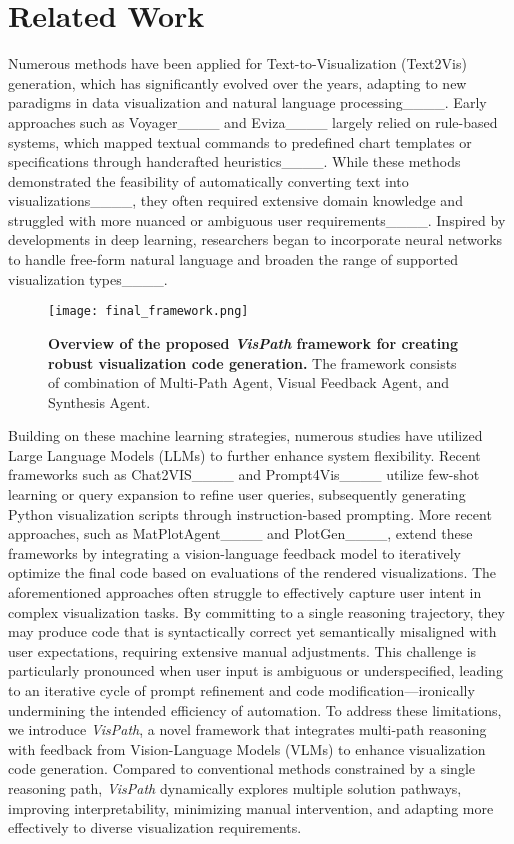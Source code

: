 \section{Related Work}
Numerous methods have been applied for Text-to-Visualization (Text2Vis) generation, which has significantly evolved over the years, adapting to new paradigms in data visualization and natural language processing____. Early approaches such as Voyager____ and Eviza____ largely relied on rule-based systems, which mapped textual commands to predefined chart templates or specifications through handcrafted heuristics____. While these methods demonstrated the feasibility of automatically converting text into visualizations____, they often required extensive domain knowledge and struggled with more nuanced or ambiguous user requirements____. Inspired by developments in deep learning, researchers began to incorporate neural networks to handle free-form natural language and broaden the range of supported visualization types____. 


\begin{figure*}[!htpb]
    \centering
    \texttt{[image: final\_framework.png]}
    \caption{\textbf{Overview of the proposed \emph{VisPath} framework for creating robust visualization code generation.} The framework consists of combination of Multi-Path Agent, Visual Feedback Agent, and Synthesis Agent.}
    \label{fig:vispath-main}
\end{figure*}

Building on these machine learning strategies, numerous studies have utilized Large Language Models (LLMs) to further enhance system flexibility. Recent frameworks such as Chat2VIS____ and Prompt4Vis____ utilize few-shot learning or query expansion to refine user queries, subsequently generating Python visualization scripts through instruction-based prompting. More recent approaches, such as MatPlotAgent____ and PlotGen____, extend these frameworks by integrating a vision-language feedback model to iteratively optimize the final code based on evaluations of the rendered visualizations. The aforementioned approaches often struggle to effectively capture user intent in complex visualization tasks. By committing to a single reasoning trajectory, they may produce code that is syntactically correct yet semantically misaligned with user expectations, requiring extensive manual adjustments. This challenge is particularly pronounced when user input is ambiguous or underspecified, leading to an iterative cycle of prompt refinement and code modification—ironically undermining the intended efficiency of automation. To address these limitations, we introduce \emph{VisPath}, a novel framework that integrates multi-path reasoning with feedback from Vision-Language Models (VLMs) to enhance visualization code generation. Compared to conventional methods constrained by a single reasoning path, \emph{VisPath} dynamically explores multiple solution pathways, improving interpretability, minimizing manual intervention, and adapting more effectively to diverse visualization requirements.